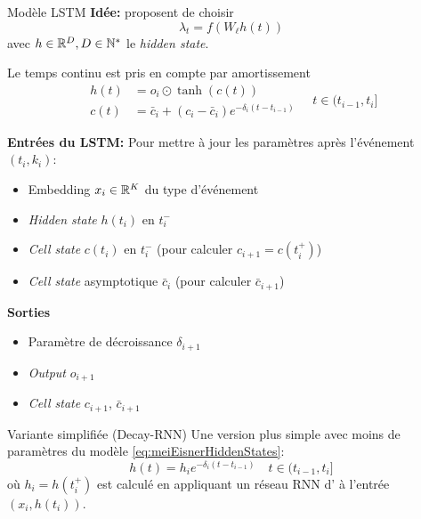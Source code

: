 \documentclass[../main.tex]{subfiles}
\begin{document}
\begin{frame}{Modèle LSTM \parencite{meiEisnerNeuralHawkes}}
\textbf{Idée:} \citeauthor{meiEisnerNeuralHawkes} proposent de choisir 
\begin{equation}
\lambda_t = f(W_\ell h(t))
\end{equation}
avec $h\in\mathbb{R}^D, D\in\mathbb{N}^*$ le \textit{hidden state}. \autocite{meiEisnerNeuralHawkes}

Le temps continu est pris en compte par amortissement
\begin{equation}\label{eq:meiEisnerHiddenStates}
	\begin{aligned}
	h(t) &= o_i \odot \tanh(c(t)) \\
	c(t) &= \bar{c}_i + (c_i - \bar{c}_i)e^{-\delta_i(t - t_{i-1})}
	\end{aligned} \quad t\in(t_{i-1}, t_i]
\end{equation}
\end{frame}

\begin{frame}
\textbf{Entrées du LSTM:} Pour mettre à jour les paramètres après l'événement $(t_i,k_i)$:\begin{itemize}
	\item[\textbullet] Embedding $x_i\in\mathbb{R}^K$ du type d'événement
	\item[\textbullet] \textit{Hidden state} $h(t_{i})$ en $t_{i}^{-}$
	\item[\textbullet] \textit{Cell state} $c(t_{i})$ en $t_i^{-}$ (pour calculer $c_{i+1} = c(t_i^{+})$)
	\item[\textbullet] \textit{Cell state} asymptotique $\bar{c}_i$ (pour calculer $\bar{c}_{i+1}$)
\end{itemize}

\textbf{Sorties}\begin{itemize}
	\item[\textbullet] Paramètre de décroissance $\delta_{i+1}$
	\item[\textbullet] \textit{Output} $o_{i+1}$
	\item[\textbullet] \textit{Cell state} $c_{i+1}$, $\bar{c}_{i+1}$
\end{itemize}
\end{frame}


\begin{frame}{Variante simplifiée (Decay-RNN)}
Une version plus simple avec moins de paramètres du modèle \eqref{eq:meiEisnerHiddenStates}:
\begin{equation}
h(t) = h_i e^{-\delta_i (t - t_{i-1})}
\quad t\in (t_{i-1}, t_i]
\end{equation}
où $h_i = h(t_i^{+})$ est calculé en appliquant un réseau RNN d'\citeauthor{elman1990srnn} \cite{elman1990srnn} à l'entrée $(x_i, h(t_i))$.

\end{frame}
\end{document}
